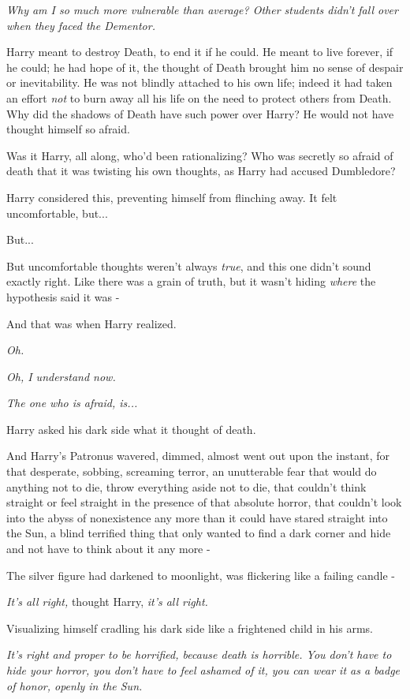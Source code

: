 \emph{Why am I so much more vulnerable than average? Other students
didn't fall over when they faced the Dementor.}

Harry meant to destroy Death, to end it if he could. He meant to live
forever, if he could; he had hope of it, the thought of Death brought
him no sense of despair or inevitability. He was not blindly attached to
his own life; indeed it had taken an effort \emph{not} to burn away all
his life on the need to protect others from Death. Why did the shadows
of Death have such power over Harry? He would not have thought himself
so afraid.

Was it Harry, all along, who'd been rationalizing? Who was secretly so
afraid of death that it was twisting his own thoughts, as Harry had
accused Dumbledore?

Harry considered this, preventing himself from flinching away. It felt
uncomfortable, but...

But...

But uncomfortable thoughts weren't always \emph{true}, and this one
didn't sound exactly right. Like there was a grain of truth, but it
wasn't hiding \emph{where} the hypothesis said it was -

And that was when Harry realized.

\emph{Oh.}

\emph{Oh, I understand now.}

\emph{The one who is afraid, is...}

Harry asked his dark side what it thought of death.

And Harry's Patronus wavered, dimmed, almost went out upon the instant,
for that desperate, sobbing, screaming terror, an unutterable fear that
would do anything not to die, throw everything aside not to die, that
couldn't think straight or feel straight in the presence of that
absolute horror, that couldn't look into the abyss of nonexistence any
more than it could have stared straight into the Sun, a blind terrified
thing that only wanted to find a dark corner and hide and not have to
think about it any more -

The silver figure had darkened to moonlight, was flickering like a
failing candle -

\emph{It's all right,} thought Harry, \emph{it's all right.}

Visualizing himself cradling his dark side like a frightened child in
his arms.

\emph{It's right and proper to be horrified, because death is horrible.
You don't have to hide your horror, you don't have to feel ashamed of
it, you can wear it as a badge of honor, openly in the Sun.}

